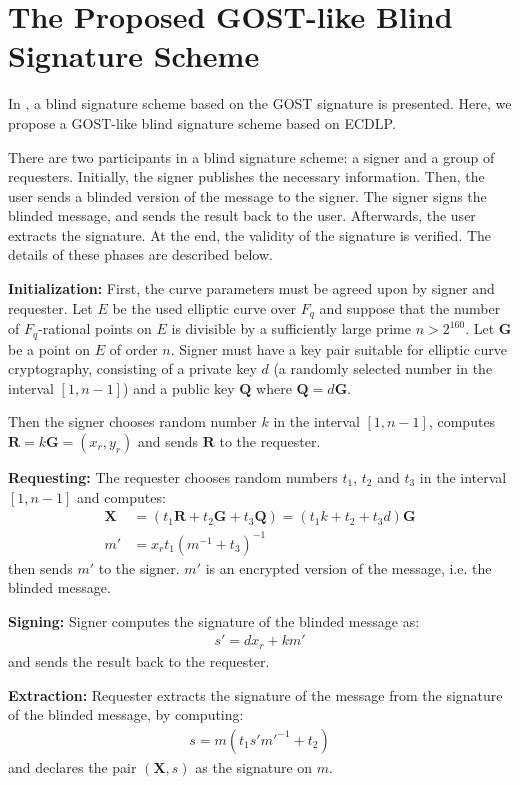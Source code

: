 \documentclass[journal,onecolumn,draftcls]{IEEEtran}
\begin{document}
\section{The Proposed GOST-like Blind Signature Scheme}
In \cite{Huang}, a blind signature scheme based on the GOST signature is presented. Here, we propose a GOST-like blind signature scheme based on ECDLP.

There are two participants in a blind signature scheme: a signer and a group of requesters. Initially, the signer publishes the necessary information. Then, the user sends a blinded version of the message to the signer. The signer signs the blinded message, and sends the result back to the user. Afterwards, the user extracts the signature. At the end, the validity of the signature is verified. The details of these phases are described below.

\textbf{Initialization:} First, the curve parameters must be agreed upon by signer and requester. Let $E$ be the used elliptic curve over $F_q$ and suppose that the number of $F_q$-rational points on $E$ is divisible by a sufficiently large prime $n>2^{160}$. Let $\textbf{G}$ be a point on $E$ of order $n$. Signer must have a key pair suitable for elliptic curve cryptography, consisting of a private key $d$ (a randomly selected number in the interval $[1,n-1]$) and a public key $\textbf{Q}$ where $\textbf{Q}=d\textbf{G}$.

Then the signer chooses random number $k$ in the interval $[1,n-1]$, computes $\textbf{R}=k\textbf{G}=(x_r,y_r)$ and sends $\textbf{R}$ to the requester.

\textbf{Requesting:} The requester chooses random numbers $t_1$, $t_2$ and $t_3$ in the interval $[1,n-1]$ and computes:
\begin{align}
\textbf{X}   &=(t_1 \textbf{R}+t_2 \textbf{G}+t_3 \textbf{Q})=(t_1 k+t_2+t_3 d)\textbf{G} \\
m' &=x_r t_1 (m^{-1}+t_3 )^{-1}
\end{align}
then sends $m'$ to the signer. $m'$ is an encrypted version of the message, i.e. the blinded message.

\textbf{Signing:} Signer computes the signature of the blinded message as:
\begin{align}
s'=dx_r+km'
\end{align}
and sends the result back to the requester.

\textbf{Extraction:} Requester extracts the signature of the message from the signature of the blinded message, by computing:
\begin{align}
s=m(t_1 s'm'^{-1}+t_2 )
\end{align}
and declares the pair $(\textbf{X},s)$ as the signature on $m$.
\end{document}
